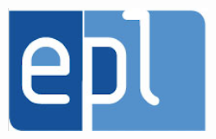 \documentclass[a4paper,justified,openany]{tufte-book}
\begin{document}
	\vfill
	\begin{figure}
		\centering
		\includegraphics[width=150pt]{epl.png}
	\end{figure}
	\vfill
	
	\tableofcontents
	
	
	
	
	
	
	
	
	
\end{document}
